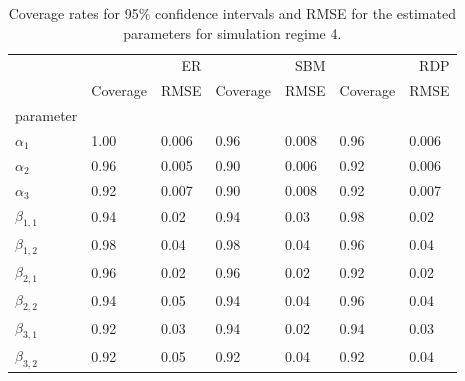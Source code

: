 \begin{table}[ht]
\centering
\caption{Coverage rates for 95\% confidence intervals and RMSE for the estimated parameters for simulation regime 4.}
\label{tab:regime_4_params}
\begin{tabular}{lllllll}
\toprule
 & \multicolumn{2}{r}{ER} & \multicolumn{2}{r}{SBM} & \multicolumn{2}{r}{RDP} \\
 & Coverage & RMSE & Coverage & RMSE & Coverage & RMSE \\
parameter &  &  &  &  &  &  \\
\midrule
$\alpha_{1}$ & 1.00 & 0.006 & 0.96 & 0.008 & 0.96 & 0.006 \\
$\alpha_{2}$ & 0.96 & 0.005 & 0.90 & 0.006 & 0.92 & 0.006 \\
$\alpha_{3}$ & 0.92 & 0.007 & 0.90 & 0.008 & 0.92 & 0.007 \\
$\beta_{1,1}$ & 0.94 & 0.02 & 0.94 & 0.03 & 0.98 & 0.02 \\
$\beta_{1,2}$ & 0.98 & 0.04 & 0.98 & 0.04 & 0.96 & 0.04 \\
$\beta_{2,1}$ & 0.96 & 0.02 & 0.96 & 0.02 & 0.92 & 0.02 \\
$\beta_{2,2}$ & 0.94 & 0.05 & 0.94 & 0.04 & 0.96 & 0.04 \\
$\beta_{3,1}$ & 0.92 & 0.03 & 0.94 & 0.02 & 0.94 & 0.03 \\
$\beta_{3,2}$ & 0.92 & 0.05 & 0.92 & 0.04 & 0.92 & 0.04 \\
\bottomrule
\end{tabular}

\end{table}
